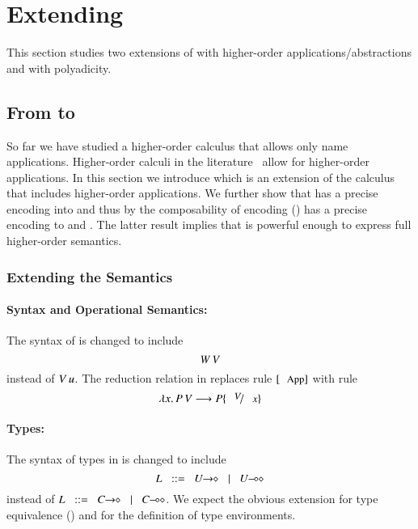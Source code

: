 \section{Extending \HOp}
\label{sec:extension}

This section studies two extensions of \HOp 
with higher-order applications/abstractions 
and 
with polyadicity.

\subsection{From \HOpp to \HOp}

So far we have studied a higher-order calculus that allows
only name applications. Higher-order calculi in the
literature~\cite{} allow for higher-order applications.
In this section we introduce \HOpp which is an 
extension of the \HOp calculus that includes
higher-order applications.
We further show that \HOpp has a precise encoding
into \HOp and thus by the composability of
encoding ()
\HOpp has a precise encoding to \HO and \sessp.
The latter result implies that \HO is powerful
enough to express full higher-order semantics.

\subsubsection{Extending the Semantics}

\paragraph{Syntax and Operational Semantics:}
The syntax of  is changed to
include
$$W\,V$$
instead of $V\,u$.
The reduction relation in 
replaces rule $\orule{App}$ 
with rule $$\appl{\abs{x}{P}}{V} \red P \subst{V}{x}$$

\paragraph{Types:}
The syntax of types in 
is changed to include $$L \bnfis \shot{U} \bnfbar \lhot{U}$$
instead of $L \bnfis \shot{C} \bnfbar \lhot{C}$.
We expect the obvious extension for type equivalence
()
and for the definition of type environments.

